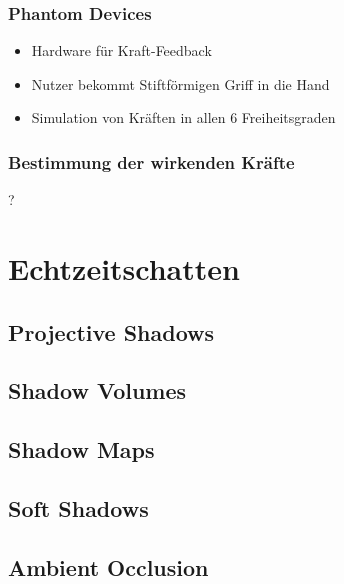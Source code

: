 \documentclass[a4paper, 12pt]{article}
\begin{document}
\subsubsection*{Phantom Devices}
\begin{itemize}
  \item Hardware für Kraft-Feedback
  \item Nutzer bekommt Stiftförmigen Griff in die Hand
  \item Simulation von Kräften in allen 6 Freiheitsgraden
\end{itemize}

\subsubsection*{Bestimmung der wirkenden Kräfte}
?





\section{Echtzeitschatten}


\subsection{Projective Shadows}


\subsection{Shadow Volumes}


\subsection{Shadow Maps}


\subsection{Soft Shadows}


\subsection{Ambient Occlusion}
\end{document}
